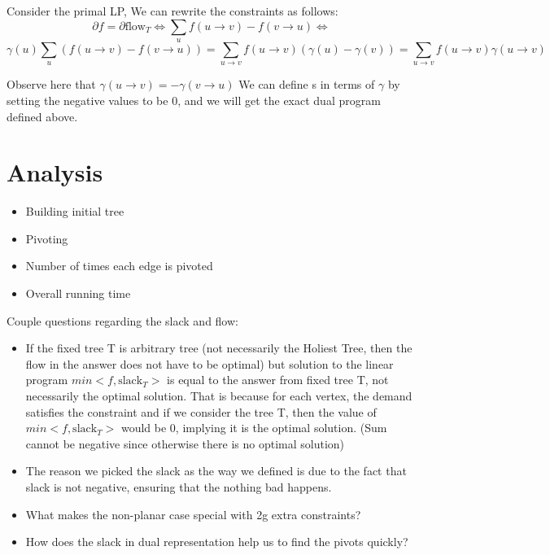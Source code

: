 \documentclass{article}
\begin{document}
Consider the primal LP, We can rewrite the constraints as follows:
\[ \partial f = \partial \text{flow}_T \Longleftrightarrow \sum 
  \limits_u f(u \rightarrow v) - f(v \rightarrow u) \Longleftrightarrow \]
\[ \gamma (u)\sum_u (f(u \rightarrow v) - f(v \rightarrow u)) = 
  \sum \limits_{u \rightarrow v} f(u \rightarrow v) (\gamma (u) - \gamma (v)) = 
  \sum \limits_{u \rightarrow v} f(u \rightarrow v) \gamma (u \rightarrow v)\]

Observe here that $\gamma (u \rightarrow v) = - \gamma (v \rightarrow u)$
We can define s in terms of $\gamma $ by setting the negative values to be 0, 
and we will get the exact dual program defined above.

\section{Analysis}
\begin{itemize}
\item Building initial tree
\item Pivoting
\item Number of times each edge is pivoted
\item Overall running time
\end{itemize}

Couple questions regarding the slack and flow:
\begin{itemize}
\item If the fixed tree T is arbitrary tree (not necessarily the Holiest Tree, 
then the flow in the answer does not have to be optimal) but solution to the 
linear program $min <f, \text{slack}_T>$ is equal to the answer from fixed tree T, 
not necessarily the optimal solution. That is because for each vertex, the 
demand satisfies the constraint and if we consider the tree T, then the value of 
$min <f, \text{slack}_T>$ would be 0, implying it is the optimal solution. 
(Sum cannot be negative since otherwise there is no optimal solution)
\item The reason we picked the slack as the way we defined is due to the fact 
that slack is not negative, ensuring that the nothing bad happens.
\item What makes the non-planar case special with 2g extra constraints?
\item How does the slack in dual representation help us to find the pivots quickly?
\end{itemize}
\end{document}
